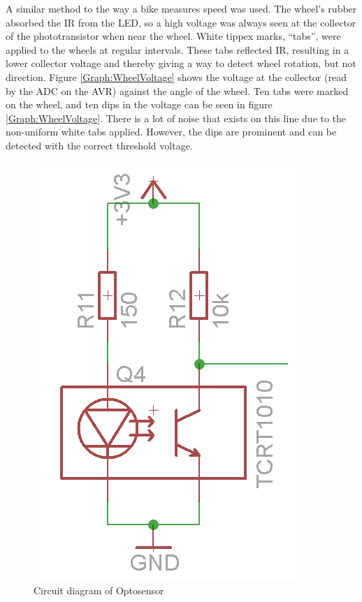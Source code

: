 A similar method to the way a bike measures speed was used. The wheel's rubber absorbed the IR from the LED, so a high voltage was always seen at the collector of the phototransistor when near the wheel. White tippex marks, ``tabs'', were applied to the wheels at regular intervals. These tabs reflected IR, resulting in a lower collector voltage and thereby giving a way to detect wheel rotation, but not direction. Figure \ref{Graph:WheelVoltage} shows the voltage at the collector (read by the ADC on the AVR) against the angle of the wheel. Ten tabs were marked on the wheel, and ten dips in the voltage can be seen in figure \ref{Graph:WheelVoltage}. There is a lot of noise that exists on this line due to the non-uniform white tabs applied. However, the dips are prominent and can be detected with the correct threshold voltage.

\begin{figure}
\centering
\includegraphics[scale=0.5]{Figures/TCRT_Circuit.png}
\caption{Circuit diagram of Optosensor}
\label{Circuit:TCRT1010}
\end{figure}

